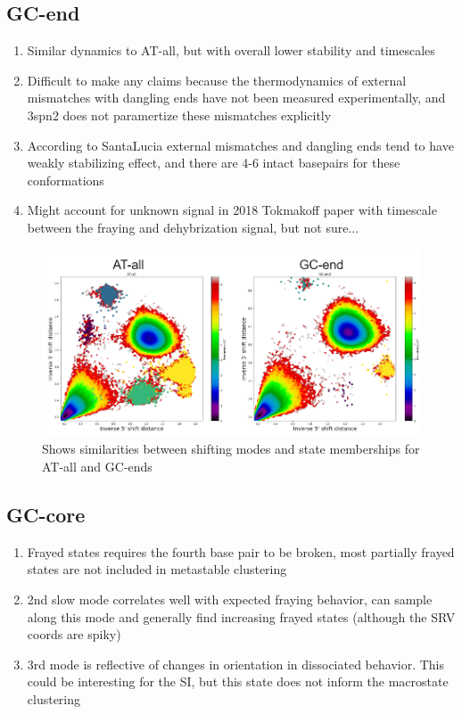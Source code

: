 \documentclass[journal=jpcbfk,manuscript=article]{achemso}
\begin{document}
\subsection{\label{sec:Results}GC-end}
\begin{enumerate}
	\item Similar dynamics to AT-all, but with overall lower stability and timescales
	\item Difficult to make any claims because the thermodynamics of external mismatches with dangling ends have not been measured experimentally, and 3spn2 does not paramertize these mismatches explicitly
	\item According to SantaLucia external mismatches and dangling ends tend to have weakly stabilizing effect, and there are 4-6 intact basepairs for these conformations
	\item Might account for unknown signal in 2018 Tokmakoff paper with timescale between the fraying and dehybrization signal, but not sure... 
\end{enumerate}  

\begin{figure}[ht!]
	\begin{center}
        \includegraphics[width=\textwidth]{Figs/skeleton/shifting_distribution.PNG}
        \caption{Shows similarities between shifting modes and state memberships for AT-all and GC-ends}
        \label{fig:shifting_distributions}
	\end{center}
\end{figure}

\subsection{\label{sec:Results}GC-core}
\begin{enumerate}
	\item Frayed states requires the fourth base pair to be broken, most partially frayed states are not included in metastable clustering
	\item 2nd slow mode correlates well with expected fraying behavior, can sample along this mode and generally find increasing frayed states (although the SRV coords are spiky)
	\item 3rd mode is reflective of changes in orientation in dissociated behavior. This could be interesting for the SI, but this state does not inform the macrostate clustering
\end{enumerate}
\end{document}
